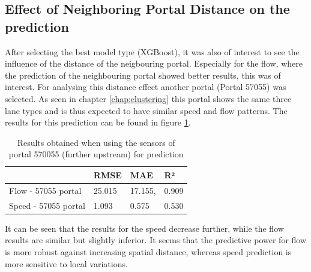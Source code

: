 	\subsection{Effect of Neighboring Portal Distance on the prediction} \label{chap:influencedistance}
	After selecting the best model type (XGBoost), it was also of interest to see the influence of the distance of the neigbouring portal. Especially for the flow, where the prediction of the neighbouring portal showed better results, this was of interest.
	For analysing this distance effect another portal (Portal 57055) was selected. As seen in chapter \ref{chap:clustering} this portal shows the same three lane types and is thus expected to have similar speed and flow patterns. The results for this prediction can be found in figure \ref{tab:result_3portal}.
	\begin{table}[H]
		\centering
		\caption{Results obtained when using the sensors of portal 570055 (further upstream) for prediction}
		\label{tab:result_3portal}
		\begin{tabular}{l|lll}
			& RMSE   & MAE    & R²    \\
			\hline
			Flow - 57055 portal      &25.015& 17.155, &0.909\\
			Speed - 57055 portal     &1.093& 0.575& 0.530\\
		\end{tabular}
	\end{table}
	\noindent It can be seen that the results for the speed decrease further, while the flow results are similar but slightly inferior. It seems that the predictive power for flow is more robust against increasing spatial distance, whereas speed prediction is more sensitive to local variations.
